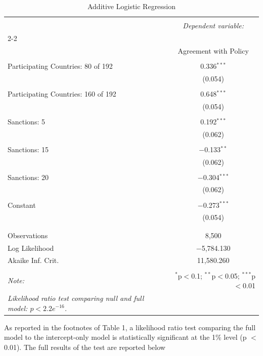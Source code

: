 \documentclass[12pt,letterpaper]{article}
\begin{document}
\begin{table}[H] \centering 
	\caption{Additive Logistic Regression} 
	\label{} 
	\begin{tabular}{@{\extracolsep{5pt}}lc} 
		\\[-1.8ex]\hline 
		\hline \\[-1.8ex] 
		& \multicolumn{1}{c}{\textit{Dependent variable:}} \\ 
		\cline{2-2} 
		\\[-1.8ex] & Agreement with Policy \\ 
		\hline \\[-1.8ex] 
		Participating Countries: 80 of 192 & 0.336$^{***}$ \\ 
		& (0.054) \\ 
		& \\ 
		Participating Countries: 160 of 192 & 0.648$^{***}$ \\ 
		& (0.054) \\ 
		& \\ 
		Sanctions: 5 & 0.192$^{***}$ \\ 
		& (0.062) \\ 
		& \\ 
		Sanctions: 15 & $-$0.133$^{**}$ \\ 
		& (0.062) \\ 
		& \\ 
		Sanctions: 20 & $-$0.304$^{***}$ \\ 
		& (0.062) \\ 
		& \\ 
		Constant & $-$0.273$^{***}$ \\ 
		& (0.054) \\ 
		& \\ 
		\hline \\[-1.8ex] 
		Observations & 8,500 \\ 
		Log Likelihood & $-$5,784.130 \\ 
		Akaike Inf. Crit. & 11,580.260 \\ 
		\hline 
		\hline \\[-1.8ex] 
		\textit{Note:}  & \multicolumn{1}{r}{$^{*}$p$<$0.1; $^{**}$p$<$0.05; $^{***}$p$<$0.01} \\ 
		\textit{Likelihood ratio test comparing null and full model: $p < 2.2 e^{-16}$.}
	\end{tabular}  
\end{table}
\vspace{1cm}

\noindent As reported in the footnotes of Table 1, a likelihood ratio test comparing the full model to the intercept-only model is statistically significant at the 1\% level (p $<$ 0.01). The full results of the test are reported below
\end{document}
